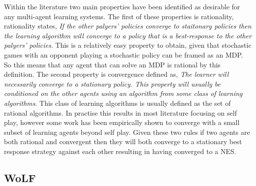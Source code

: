 \documentclass[conference]{IEEEtran}
\begin{document}
Within the literature two main properties have been identified as desirable for any multi-agent learning systems. The first of these properties is rationality\cite{bowling2002multiagent}, rationality states, \textit{If the other palyers' policies converge to staitonary policies then the learning algorithm will converge to a policy that is a best-response to the other palyers' policies}. This is a relatively easy property to obtain, given that stochastic games with an opponent playing a stochastic policy can be framed as an MDP. So this means that any agent that can solve an MDP is rational by this definition\cite{bowling2002multiagent}. The second property is convergence defined as, \textit{The learner will necessarily converge to a stationary policy. This property will usually be conditioned on the other agents using an algorithm from some class of learning algorithms}. This class of learning algorithms is usually defined as the set of rational algorithms. In practise this results in most literature focusing on self play, however some work has been empirically shown to converge with a small subset of learning agents beyond self play\cite{bowling2002multiagent}. Given these two rules if two agents are both rational and convergent then they will both converge to a stationary best response strategy against each other resulting in having converged to a NES.


\subsection{WoLF}
\end{document}
